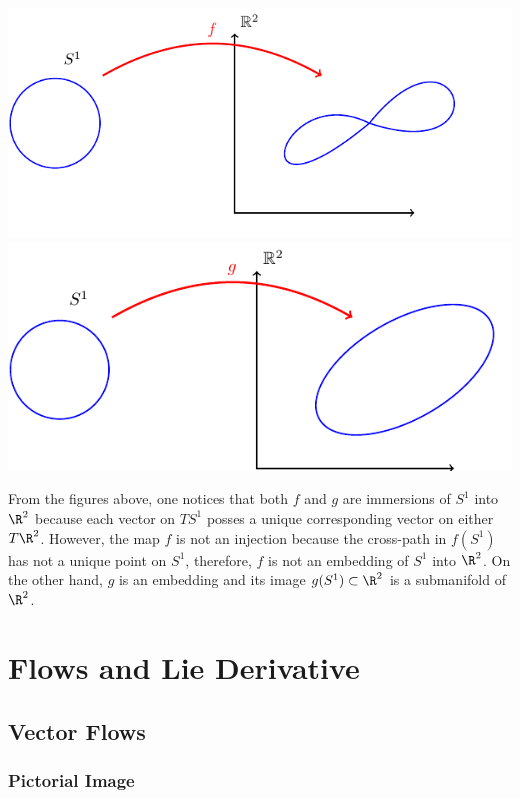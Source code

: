 \begin{center}
  \includegraphics[scale=.7]{Pictures/tikz-immersion.pdf}
  \includegraphics[scale=.7]{Pictures/tikz-embedding.pdf}
\end{center}

From the figures above, one notices that both $f$ and $g$ are immersions of $S^1$ into $\R^2$ because each  vector on $TS^1$ posses a unique corresponding vector on either $T\R^2$. However, the map $f$ is not an injection because the cross-path in $f(S^1)$ has not a unique point on $S^1$, therefore, $f$ is not an embedding of $S^1$ into $\R^2$. On the other hand, $g$ is an embedding and its image $g(S^1)\subset \R^2$ is a submanifold of $\R^2$.

\section{Flows and Lie Derivative}

\subsection{Vector Flows}

\subsubsection*{Pictorial Image}

